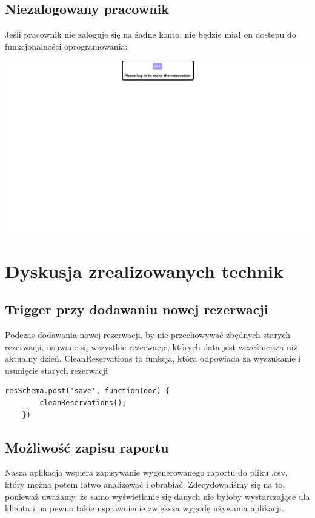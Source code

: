 \documentclass[12pt]{article}
\begin{document}
\newpage
\subsection{Niezalogowany pracownik}
\begin{minipage}{\textwidth}
\noindent Jeśli pracownik nie zaloguje się na żadne konto, nie będzie miał on dostępu do funkcjonalności oprogramowania:
\begin{center}
\includegraphics[width=\textwidth]{media/NotLoggenIn.png}
\end{center}
\end{minipage}

\newpage
\section{Dyskusja zrealizowanych technik}

\subsection{Trigger przy dodawaniu nowej rezerwacji}
Podczas dodawania nowej rezerwacji, by nie przechowywać zbędnych starych rezerwacji, usuwane są wszystkie rezerwacje, których data jest wcześniejsza niż aktualny dzień. CleanReservations to funkcja, która odpowiada za wyszukanie i usunięcie starych rezerwacji
\begin{lstlisting}[caption={Trigger}]
	resSchema.post('save', function(doc) {
		cleanReservations();
	})
\end{lstlisting}

\subsection{Możliwość zapisu raportu}
Nasza aplikacja wspiera zapisywanie wygenerowanego raportu do pliku .csv, który można potem łatwo analizować i obrabiać. Zdecydowaliśmy się na to, ponieważ uważamy, że samo wyświetlanie się danych nie byłoby wystarczające dla klienta i na pewno takie usprawnienie zwiększa wygodę używania aplikacji.
\end{document}
